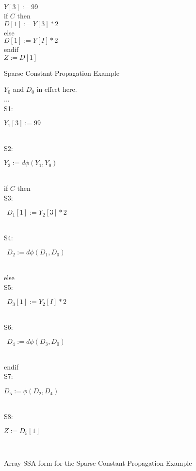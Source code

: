 \begin{figure}%

\begin{center}
\parbox{3.0in}{
\begin{programa}
\Ta $Y[3] := 99$ \\
\Ta if $C$ then \\
\Tb   $D[1] := Y[3] * 2$ \\
\Ta else \\
\Tb   $D[1] := Y[I] * 2$ \\
\Ta endif \\
\Ta $Z := D[1]$ 
\end{programa}
}
\end{center}
\caption{Sparse Constant Propagation Example}
\label{fig:sc-ex-source}
\end{figure}

\begin{figure}%
\begin{center}
\parbox{3.0in}{
\begin{programa}
\Tb $Y_0$ and $D_0$ in effect here. \\
\Tb  ... \\
\mbox{S1:}\Tb \parbox{1.5in} {$Y_1[3] := 99$}  \\
\mbox{S2:}\Tb \parbox{1.5in} {$Y_2 := d\phi(Y_1,Y_0)$}  \\
\Tb  if $C$ then \\
\mbox{S3:}\Tb \parbox{1.5in} {$\ \ D_1[1] := Y_2[3] * 2$}  \\
\mbox{S4:}\Tb \parbox{1.5in} {$\ \ D_2 := d\phi(D_1,D_0)$}  \\
\Tb else \\
\mbox{S5:}\Tb \parbox{1.5in} {$\ \ D_3[1] := Y_2[I] * 2$}  \\
\mbox{S6:}\Tb \parbox{1.5in} {$\ \ D_4 := d\phi(D_3,D_0)$}  \\
\Tb endif \\
\mbox{S7:}\Tb \parbox{1.5in} {$D_5 := \phi(D_2,D_4)$}  \\
\mbox{S8:}\Tb \parbox{1.5in} {$Z := D_5[1]$}  \\
\end{programa}
}
\end{center}
\caption{Array SSA form for the Sparse Constant Propagation Example}
\label{fig:sc-ex-ssa}
\end{figure}

